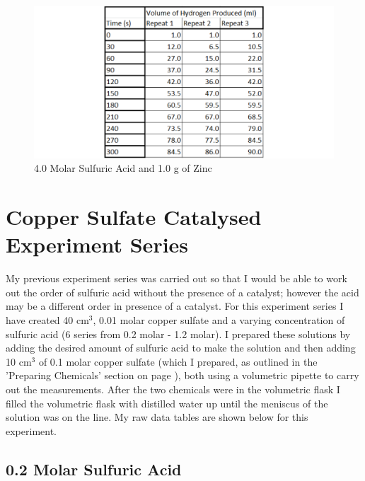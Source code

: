 \begin{figure}[H]
    \includegraphics[width=\textwidth]{./Experiment/Images/1NonCatalyst/40Molar.pdf}
    \caption{4.0 Molar Sulfuric Acid and 1.0 g of Zinc} \label{fig:40MolarSARawData}
\end{figure}

\section{Copper Sulfate Catalysed Experiment Series}

My previous experiment series was carried out so that I would be able to work out the order of sulfuric acid without the presence of a catalyst; however the acid may be a different order in presence of a catalyst. For this experiment series I have created 40 cm$^3$, 0.01 molar copper sulfate and a varying concentration of sulfuric acid (6 series from 0.2 molar - 1.2 molar). I prepared these solutions by adding the desired amount of sulfuric acid to make the solution and then adding 10 cm$^3$ of 0.1 molar copper sulfate (which I prepared, as outlined in the 'Preparing Chemicals' section on page \pageref{Preparing Chemicals}), both using a volumetric pipette to carry out the measurements. After the two chemicals were in the volumetric flask I filled the volumetric flask with distilled water up until the meniscus of the solution was on the line. My raw data tables are shown below for this experiment.

	\subsection{0.2 Molar Sulfuric Acid}

